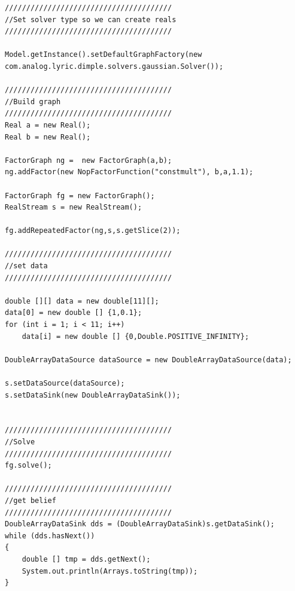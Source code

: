 \ifjava
\begin{lstlisting}
///////////////////////////////////////                                                                                                
//Set solver type so we can create reals                                                                                       
///////////////////////////////////////

Model.getInstance().setDefaultGraphFactory(new com.analog.lyric.dimple.solvers.gaussian.Solver());

///////////////////////////////////////                                                                                                
//Build graph                                                                                                                  
///////////////////////////////////////                                                                                                
Real a = new Real();
Real b = new Real();

FactorGraph ng =  new FactorGraph(a,b);
ng.addFactor(new NopFactorFunction("constmult"), b,a,1.1);

FactorGraph fg = new FactorGraph();
RealStream s = new RealStream();

fg.addRepeatedFactor(ng,s,s.getSlice(2));

///////////////////////////////////////                                                                                                
//set data                                                                                                                     
/////////////////////////////////////// 

double [][] data = new double[11][];
data[0] = new double [] {1,0.1};
for (int i = 1; i < 11; i++)
	data[i] = new double [] {0,Double.POSITIVE_INFINITY};

DoubleArrayDataSource dataSource = new DoubleArrayDataSource(data);

s.setDataSource(dataSource);
s.setDataSink(new DoubleArrayDataSink());


///////////////////////////////////////                                                                                                
//Solve                                                                                                                        
///////////////////////////////////////                                                                                                
fg.solve();

///////////////////////////////////////                                                                                                
//get belief                                                                                                                        
///////////////////////////////////////
DoubleArrayDataSink dds = (DoubleArrayDataSink)s.getDataSink();
while (dds.hasNext())
{			
	double [] tmp = dds.getNext();
    System.out.println(Arrays.toString(tmp));
}
\end{lstlisting}
\fi

